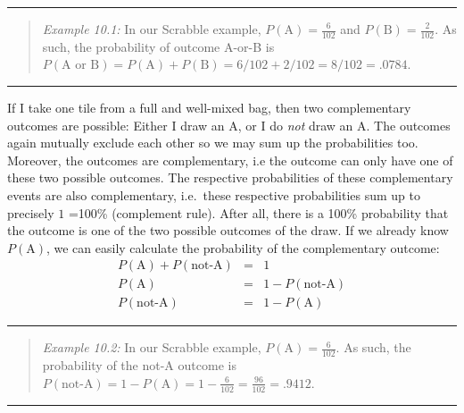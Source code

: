 \documentclass[
]{book}
\begin{document}
\begin{center}\rule{0.5\linewidth}{0.5pt}\end{center}

\begin{quote}
\emph{Example 10.1:}
In our Scrabble example, \(P(\textrm{A})=\frac{6}{102}\) and
\(P(\textrm{B})=\frac{2}{102}\). As such, the probability of outcome A-or-B is
\(P(\textrm{A or B})=P(\textrm{A})+P(\textrm{B})=6/102+2/102=8/102=.0784\).
\end{quote}

\begin{center}\rule{0.5\linewidth}{0.5pt}\end{center}

If I take one tile from a full and well-mixed bag, then two
complementary outcomes are possible: Either I draw an A, or I do \emph{not}
draw an A. The outcomes again mutually exclude each other so we may
sum up the probabilities too. Moreover, the
outcomes are complementary, i.e the outcome can only have one
of these two possible outcomes. The respective probabilities of these
complementary events are also complementary, i.e.~these
respective probabilities sum up to precisely \(1\) =100\% (complement rule).
After all, there is a 100\% probability that the outcome is one of
the two possible outcomes of the draw. If we already know \(P(\textrm{A})\),
we can easily calculate the probability of the complementary
outcome:
\begin{align}
    P(\textrm{A}) + P(\textrm{not-A}) & = & 1\\
    P(\textrm{A}) & = & 1 - P(\textrm{not-A})\\
    P(\textrm{not-A}) & = & 1 - P(\textrm{A})
    \label{eq:complementrule}
\end{align}

\begin{center}\rule{0.5\linewidth}{0.5pt}\end{center}

\begin{quote}
\emph{Example 10.2:}
In our Scrabble example, \(P(\textrm{A})=\frac{6}{102}\). As such, the probability
of the not-A outcome is
\(P(\textrm{not-A})= 1 - P(\textrm{A}) = 1 - \frac{6}{102} = \frac{96}{102} = .9412\).
\end{quote}

\begin{center}\rule{0.5\linewidth}{0.5pt}\end{center}
\end{document}
